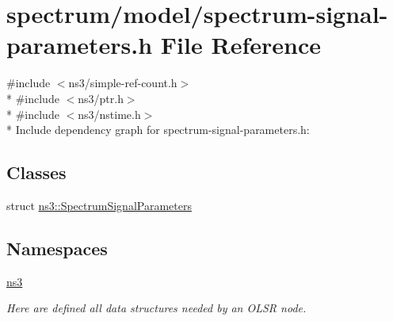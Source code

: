 \hypertarget{spectrum-signal-parameters_8h}{}\section{spectrum/model/spectrum-\/signal-\/parameters.h File Reference}
\label{spectrum-signal-parameters_8h}
{\ttfamily \#include $<$ns3/simple-\/ref-\/count.\+h$>$}\\*
{\ttfamily \#include $<$ns3/ptr.\+h$>$}\\*
{\ttfamily \#include $<$ns3/nstime.\+h$>$}\\*
Include dependency graph for spectrum-\/signal-\/parameters.h\+:
\subsection*{Classes}
\begin{DoxyCompactItemize}
\item 
struct \hyperlink{structns3_1_1SpectrumSignalParameters}{ns3\+::\+Spectrum\+Signal\+Parameters}
\end{DoxyCompactItemize}
\subsection*{Namespaces}
\begin{DoxyCompactItemize}
\item 
 \hyperlink{namespacens3}{ns3}
\begin{DoxyCompactList}\small\item\em Here are defined all data structures needed by an O\+L\+SR node. \end{DoxyCompactList}\end{DoxyCompactItemize}
